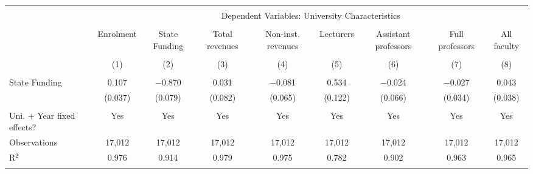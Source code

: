 
\begin{tabular}{@{\extracolsep{5pt}}lcccccccc} 
\\[-1.8ex]\hline 
\hline \\[-1.8ex] 
 & \multicolumn{8}{c}{Dependent Variables: University Characteristics} \\ 
\cline{2-9} 
\\[-1.8ex] & Enrolment & State Funding & Total revenues & Non-inst. revenues & Lecturers & Assistant professors & Full professors & All faculty \\ 
\\[-1.8ex] & (1) & (2) & (3) & (4) & (5) & (6) & (7) & (8)\\ 
\hline \\[-1.8ex] 
 State Funding & 0.107 & $-$0.870 & 0.031 & $-$0.081 & 0.534 & $-$0.024 & $-$0.027 & 0.043 \\ 
  & (0.037) & (0.079) & (0.082) & (0.065) & (0.122) & (0.066) & (0.034) & (0.038) \\ 
 \hline \\[-1.8ex] 
Uni. + Year fixed effects? & Yes & Yes & Yes & Yes & Yes & Yes & Yes & Yes \\ 
Observations & 17,012 & 17,012 & 17,012 & 17,012 & 17,012 & 17,012 & 17,012 & 17,012 \\ 
R$^{2}$ & 0.976 & 0.914 & 0.979 & 0.975 & 0.782 & 0.902 & 0.963 & 0.965 \\ 
\hline 
\hline \\[-1.8ex] 
\end{tabular} 
